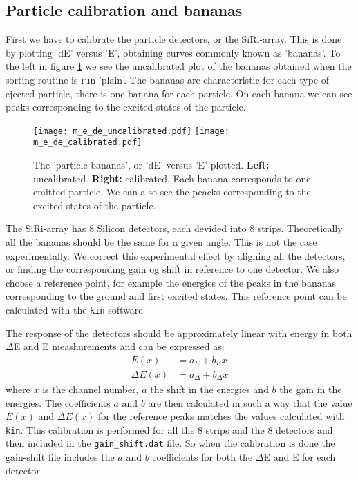 \documentclass[11pt,a4wide]{article}
\begin{document}
\subsection{Particle calibration and bananas} \label{sec: particle_calib}
First we have to calibrate the particle detectors, or the SiRi-array. This is done by plotting 'dE' versus 'E', obtaining curves commonly known as 'bananas'. To the left in figure \ref{fig: de_e} we see the uncalibrated plot of the bananas obtained when the sorting routine is run 'plain'. The bananas are characteristic for each type of ejected particle, there is one banana for each particle. On each banana we can see peaks corresponding to the excited states of the particle. 

\begin{figure}[htp]
\centering
\texttt{[image: m\_e\_de\_uncalibrated.pdf]}
\texttt{[image: m\_e\_de\_calibrated.pdf]} %
\caption{The 'particle bananas', or 'dE' versus 'E' plotted. \textbf{Left:} uncalibrated. \textbf{Right:} calibrated. Each banana corresponds to one emitted particle. We can also see the peacks corresponding to the excited states of the particle.}
\label{fig: de_e}
\end{figure}

The SiRi-array has 8 Silicon detectors, each devided into 8 strips. Theoretically all the bananas should be the same for a given angle. This is not the case experimentally. We correct this experimental effect by aligning all the detectors, or finding the corresponding gain og shift in reference to one detector. We also choose a reference point, for example the energies of the peaks in the bananas corresponding to the ground and first excited states. This reference point can be calculated with the \texttt{kin} software. 

The response of the detectors should be approximately linear with energy in both $\Delta$E and E meashurements and can be expressed as:
\begin{align*}
E(x) &= a_E + b_Ex\\
\Delta E(x) &= a_\Delta + b_\Delta x
\end{align*}
where $x$ is the channel number, $a$ the shift in the energies and $b$ the gain in the energies. The coefficients $a$ and $b$ are then calculated in such a way that the value $E(x)$ and $\Delta E(x)$ for the reference peaks matches the values calculated with \texttt{kin}. This calibration is performed for all the 8 strips and the 8 detectors and then included in the \texttt{gain\_shift.dat} file. So when the calibration is done the gain-shift file includes the $a$ and $b$ coefficients for both the $\Delta$E and E for each detector.
\end{document}
